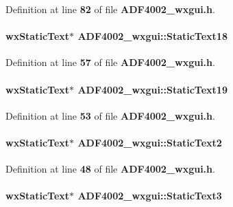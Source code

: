 Definition at line {\bf 82} of file {\bf A\+D\+F4002\+\_\+wxgui.\+h}.

\paragraph[{Static\+Text18}]{\setlength{\rightskip}{0pt plus 5cm}wx\+Static\+Text$\ast$ A\+D\+F4002\+\_\+wxgui\+::\+Static\+Text18}\label{classADF4002__wxgui_a647003d6c31c982ba52d6511579e8fd0}


Definition at line {\bf 57} of file {\bf A\+D\+F4002\+\_\+wxgui.\+h}.

\paragraph[{Static\+Text19}]{\setlength{\rightskip}{0pt plus 5cm}wx\+Static\+Text$\ast$ A\+D\+F4002\+\_\+wxgui\+::\+Static\+Text19}\label{classADF4002__wxgui_a2f56ceadfcbfd07546c54dc1e2be9381}


Definition at line {\bf 53} of file {\bf A\+D\+F4002\+\_\+wxgui.\+h}.

\paragraph[{Static\+Text2}]{\setlength{\rightskip}{0pt plus 5cm}wx\+Static\+Text$\ast$ A\+D\+F4002\+\_\+wxgui\+::\+Static\+Text2}\label{classADF4002__wxgui_a84143497de21802924fca9d5f50625ec}


Definition at line {\bf 48} of file {\bf A\+D\+F4002\+\_\+wxgui.\+h}.

\paragraph[{Static\+Text3}]{\setlength{\rightskip}{0pt plus 5cm}wx\+Static\+Text$\ast$ A\+D\+F4002\+\_\+wxgui\+::\+Static\+Text3}\label{classADF4002__wxgui_ab84b8e9f30fc189f29f1cc12ee5f1fce}


